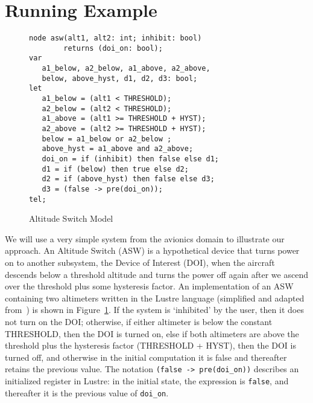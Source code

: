 \section{Running Example}
\label{sec:example}


\begin{figure}[t]
\centering
{\smaller
\begin{verbatim}
node asw(alt1, alt2: int; inhibit: bool) 
        returns (doi_on: bool);
var
   a1_below, a2_below, a1_above, a2_above, 
   below, above_hyst, d1, d2, d3: bool;
let
   a1_below = (alt1 < THRESHOLD); 
   a2_below = (alt2 < THRESHOLD);
   a1_above = (alt1 >= THRESHOLD + HYST); 
   a2_above = (alt2 >= THRESHOLD + HYST);    
   below = a1_below or a2_below ;
   above_hyst = a1_above and a2_above;   
   doi_on = if (inhibit) then false else d1;
   d1 = if (below) then true else d2; 
   d2 = if (above_hyst) then false else d3;
   d3 = (false -> pre(doi_on)); 
tel;
\end{verbatim}
}
\vspace{-0.1in}
\caption{Altitude Switch Model}
\label{fig:asw}
\end{figure}

We will use a very simple system from the avionics domain to illustrate our approach. An Altitude Switch (ASW) is a hypothetical device that turns power on to another subsystem, the Device of Interest (DOI), when the aircraft descends below a threshold altitude and turns the power off again after we ascend over the threshold plus some hysteresis factor.  An implementation of an ASW containing two altimeters written in the Lustre language (simplified and adapted from~\cite{HCW02:ase-deviation}) is shown in Figure~\ref{fig:asw}.  If the system is `inhibited' by the user, then it does not turn on the DOI; otherwise, if either altimeter is below the constant THRESHOLD, then the DOI is turned on, else if both altimeters are above the threshold plus the hysteresis factor (THRESHOLD + HYST), then the DOI is turned off, and otherwise in the initial computation it is false and thereafter retains the previous value.  The notation \texttt{(false -> pre(doi\_on))} describes an initialized register in Lustre: in the initial state, the expression is \texttt{false}, and thereafter it is the previous value of \texttt{doi\_on}.

